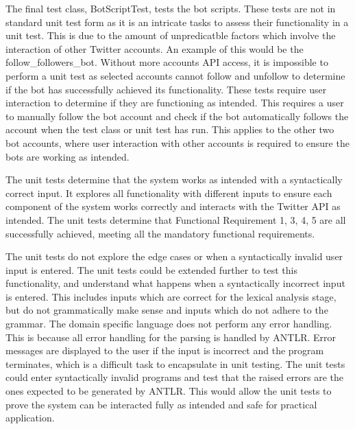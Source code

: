 The final test class, BotScriptTest, tests the bot scripts. These tests are not in standard unit test form as it is an intricate tasks to assess their functionality in a unit test. This is due to the amount of unpredicatble factors which involve the interaction of other Twitter accounts. An example of this would be the follow\_followers\_bot. Without more accounts API access, it is impossible to perform a unit test as selected accounts cannot follow and unfollow to determine if the bot has successfully achieved its functionality. These tests require user interaction to determine if they are functioning as intended. This requires a user to manually follow the bot account and check if the bot automatically follows the account when the test class or unit test has run. This applies to the other two bot accounts, where user interaction with other accounts is required to ensure the bots are working as intended. \newline \par

The unit tests determine that the system works as intended with a syntactically correct input. It explores all functionality with different inputs to ensure each component of the system works correctly and interacts with the Twitter API as intended. The unit tests determine that Functional Requirement 1, 3, 4, 5 are all successfully achieved, meeting all the mandatory functional requirements. \newline \par

The unit tests do not explore the edge cases or when a syntactically invalid user input is entered. The unit tests could be extended further to test this functionality, and understand what happens when a syntactically incorrect input is entered. This includes inputs which are correct for the lexical analysis stage, but do not grammatically make sense and inputs which do not adhere to the grammar. The domain specific language does not perform any error handling. This is because all error handling for the parsing is handled by ANTLR. Error messages are displayed to the user if the input is incorrect and the program terminates, which is a difficult task to encapsulate in unit testing. The unit tests could enter syntactically invalid programs and test that the raised errors are the ones expected to be generated by ANTLR. This would allow the unit tests to prove the system can be interacted fully as intended and safe for practical application. 

